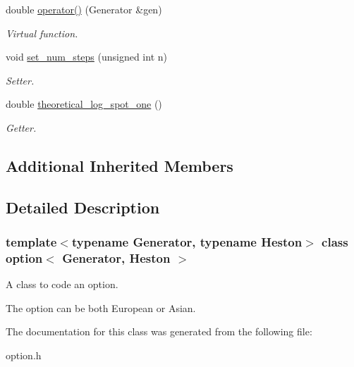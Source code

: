 \begin{DoxyCompactItemize}
\mbox{\label{classoption_a74c39ed0494f2e66bd92ea84bd5dfa4b}} 
double \mbox{\hyperlink{classoption_a74c39ed0494f2e66bd92ea84bd5dfa4b}{operator()}} (Generator \&gen)
\begin{DoxyCompactList}\small\item\em Virtual function. \end{DoxyCompactList}\item 
\mbox{\label{classoption_a77b5efa87751a2e506de485483bbd6d8}} 
void \mbox{\hyperlink{classoption_a77b5efa87751a2e506de485483bbd6d8}{set\+\_\+num\+\_\+steps}} (unsigned int n)
\begin{DoxyCompactList}\small\item\em Setter. \end{DoxyCompactList}\item 
\mbox{\label{classoption_a89c94c4ac7adbacbd9e9e667063e78d5}} 
double \mbox{\hyperlink{classoption_a89c94c4ac7adbacbd9e9e667063e78d5}{theoretical\+\_\+log\+\_\+spot\+\_\+one}} ()
\begin{DoxyCompactList}\small\item\em Getter. \end{DoxyCompactList}\end{DoxyCompactItemize}
\subsection*{Additional Inherited Members}


\subsection{Detailed Description}
\subsubsection*{template$<$typename Generator, typename Heston$>$\newline
class option$<$ Generator, Heston $>$}

A class to code an option. 

The option can be both European or Asian. 

The documentation for this class was generated from the following file\+:\begin{DoxyCompactItemize}
\item 
option.\+h\end{DoxyCompactItemize}
